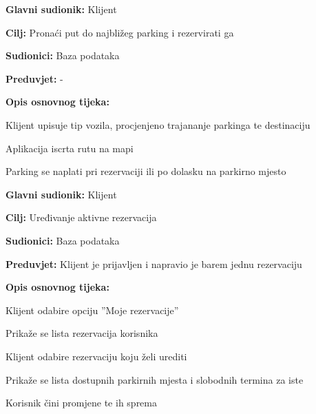 \begin{packed_item}
\begin{packed_item}
\begin{packed_enum}
						\end{packed_enum}

                        

                        \noindent {}
					\begin{packed_item}
	
						\item \textbf{Glavni sudionik: }Klijent
						\item  \textbf{Cilj:} Pronaći put do najbližeg parking i rezervirati ga
						\item  \textbf{Sudionici:} Baza podataka
						\item  \textbf{Preduvjet:} - 
						\item  \textbf{Opis osnovnog tijeka:}
						
						\item[] \begin{packed_enum}
	
							\item Klijent upisuje tip vozila, procjenjeno trajananje parkinga te destinaciju
							\item Aplikacija iscrta rutu na mapi
							\item Parking se naplati pri rezervaciji ili po dolasku na parkirno mjesto
							
						\end{packed_enum}
					\end{packed_item}

                        \noindent {}
					\begin{packed_item}
	
						\item \textbf{Glavni sudionik: }Klijent
						\item  \textbf{Cilj:} Uređivanje aktivne rezervacija
						\item  \textbf{Sudionici:} Baza podataka
						\item  \textbf{Preduvjet:} Klijent je prijavljen i napravio je barem jednu rezervaciju
						\item  \textbf{Opis osnovnog tijeka:}
						
						\item[] \begin{packed_enum}
	
							\item Klijent odabire opciju ”Moje rezervacije”
							\item Prikaže se lista rezervacija korisnika
							\item Klijent odabire rezervaciju koju želi urediti
                                \item Prikaže se lista dostupnih parkirnih mjesta i slobodnih termina za iste
                                \item Korisnik čini promjene te ih sprema
							

\end{packed_enum}
\end{packed_item}
\end{packed_item}
\end{packed_item}
